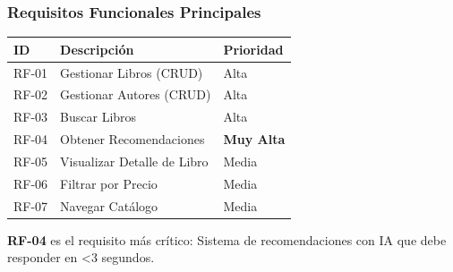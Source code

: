 \documentclass[aspectratio=169]{beamer}
\begin{document}
\begin{frame}
\frametitle{Requisitos Funcionales Principales}

\begin{table}
\centering
\small
\begin{tabular}{p{2.5cm}p{7cm}p{2cm}}
\toprule
\textbf{ID} & \textbf{Descripción} & \textbf{Prioridad} \\
\midrule
RF-01 & Gestionar Libros (CRUD) & Alta \\
RF-02 & Gestionar Autores (CRUD) & Alta \\
RF-03 & Buscar Libros & Alta \\
RF-04 & Obtener Recomendaciones & \textbf{Muy Alta} \\
RF-05 & Visualizar Detalle de Libro & Media \\
RF-06 & Filtrar por Precio & Media \\
RF-07 & Navegar Catálogo & Media \\
\bottomrule
\end{tabular}
\end{table}

\vspace{0.3cm}

\begin{tcolorbox}[colback=blue!5, colframe=blue!50]
\textbf{RF-04} es el requisito más crítico: Sistema de recomendaciones con IA que debe responder en <3 segundos.
\end{tcolorbox}

\end{frame}
\end{document}
